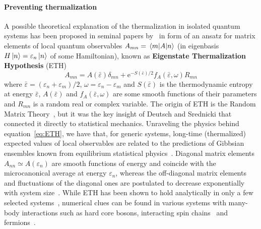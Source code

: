 \paragraph{Preventing thermalization} A possible theoretical explanation of the thermalization in isolated quantum systems
has been proposed in seminal papers by~\textcite{Deutsch19912046,Srednicki1994} in form of an ansatz for matrix elements of 
local quantum observables \(A_{mn} = \matrixel{m}{A}{n}\) (in eigenbasis \(H\ket{n}=\varepsilon_n \ket{n}\) of some Hamiltonian),
known as \textbf{Eigenstate Thermalization Hypothesis} (ETH)
\begin{equation}
    A_{mn} = A(\bar{\varepsilon}) \delta_{mn} + \mathrm{e}^{-S(\bar{\varepsilon})/2}f_{A}(\bar{\varepsilon},\omega)R_{mn}
    \label{eq:ETH}
\end{equation}
where \(\bar{\varepsilon} = (\varepsilon_n+\varepsilon_m)/2\), \(\omega=\varepsilon_n-\varepsilon_m\) and \(S(\bar{\varepsilon})\) is
the thermodynamic entropy at energy \(\bar{\varepsilon}\),  \(A(\bar{\varepsilon})\) and \(f_{A}(\bar{\varepsilon},\omega)\) are
some smooth functions of their parameters and
\(R_{mn}\) is a random real or complex variable. The origin of ETH is the Random Matrix Theory~\autocite{Wigner1955548,mehta2004random},
but it was the key insight of Deutsch and Srednicki that connected it directly to statistical mechanics.
Unraveling the physics behind equation~\eqref{eq:ETH}, we have that, for generic systems,
long-time (thermalized) expected values of local observables are related to the predictions of Gibbsian ensembles
known from equilibrium statistical physics~\autocite{DAlessio2016}. Diagonal matrix elements \(A_{nn} \simeq A(\varepsilon_n)\) are smooth functions of energy and
coincide with the microcanonical average at energy \(\varepsilon_n\), whereas the off-diagonal matrix elements and fluctuations
of the diagonal ones are postulated to decrease exponentially with system size~\autocite{Beugeling2014}.
While ETH has been shown to hold analytically in only a few selected systems~\autocite{Magan2016}, numerical clues can be
found in various systems with many-body interactions such as hard core bosons, interacting spin 
chains~\autocite{Santos2010_2,Rigol2010,Khatami2013,Rigol2009a} and fermions~\autocite{Neuenhahn2012,Rigol2009}.

